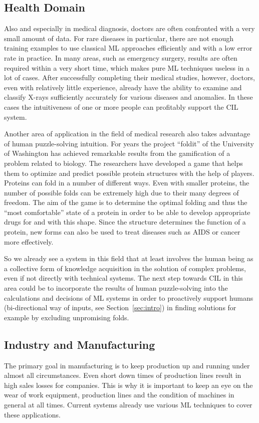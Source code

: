 \documentclass[conference]{IEEEtran}
\begin{document}
\subsection{Health Domain}
Also and especially in medical diagnosis, doctors are often confronted with a very small amount of data.
For rare diseases in particular, there are not enough training examples to use classical ML approaches efficiently and with a low error rate in practice.
In many areas, such as emergency surgery, results are often required within a very short time, which makes pure ML techniques useless in a lot of cases.
After successfully completing their medical studies, however, doctors, even with relatively little experience, already have the ability to examine and classify X-rays sufficiently accurately for various diseases and anomalies.
In these cases the intuitiveness of one or more people can profitably support the CIL system.

Another area of application in the field of medical research also takes advantage of human puzzle-solving intuition. 
For years the project ``foldit'' of the University of Washington has achieved remarkable results\cite{Foldit:results} from the gamification of a problem related to biology.
The researchers have developed a game that helps them to optimize and predict possible protein structures with the help of 
players\cite{Foldit:web}.
Proteins can fold in a number of different ways. Even with smaller proteins, the number of possible folds can be extremely high due to their many degrees of freedom.
The aim of the game is to determine the optimal folding and thus the ``most comfortable'' state of a protein in order to be able to develop appropriate drugs for and with this shape.
Since the structure determines the function of a protein\cite{Foldit:web}, new forms can also be used to treat diseases such as AIDS or cancer more effectively.

So we already see a system in this field that at least involves the human being as a collective form of knowledge acquisition in the solution of complex problems, even if not directly with technical systems.
The next step towards CIL in this area could be to incorporate the results of human puzzle-solving into the calculations and decisions of ML systems in order to proactively support humans (bi-directional way of inputs, see Section~\ref{sec:intro}) in finding solutions 
for example by excluding unpromising folds.


\subsection{Industry and Manufacturing}
The primary goal in manufacturing is to keep production up and running under almost all circumstances. 
Even short down times of production lines result in high sales losses for companies.
This is why it is important to keep an eye on the wear of work equipment, production lines and the condition of machines in general at all times.
Current systems already use various ML techniques\cite{Manu:wuest} to cover these applications.
\end{document}
